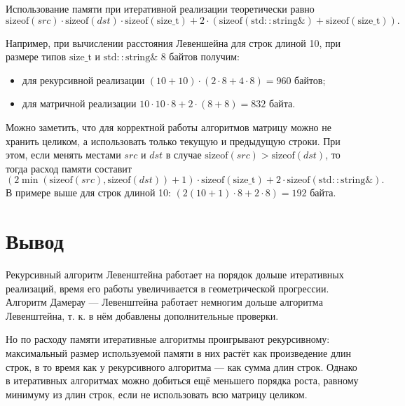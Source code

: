 Использование памяти при итеративной реализации теоретически равно
\[
\mathrm{sizeof}(src) \cdot \mathrm{sizeof}(dst) \cdot \mathrm{sizeof(size\_t)} + 2\cdot(\mathrm{sizeof (std\!::\!string\&)} + \mathrm{sizeof(size\_t)}).
\]

Например, при вычислении расстояния Левеншейна для строк длиной 10, при размере типов $\mathrm{size\_t}$ и $\mathrm{std\!::\!string\&}$ 8 байтов получим:
\begin{itemize}
	\item для рекурсивной реализации $(10 + 10) \cdot (2\cdot8 + 4\cdot8) = 960$ байтов;
	\item для матричной реализации $10 \cdot 10 \cdot 8 + 2\cdot(8 + 8) = 832$ байта.
\end{itemize}

Можно заметить, что для корректной работы алгоритмов матрицу можно не хранить целиком, а использовать только текущую и предыдущую строки. При этом, если менять местами $src$ и $dst$ в случае $\mathrm{sizeof}(src) > \mathrm{sizeof}(dst)$, то тогда расход памяти составит
\[
(2\min(\mathrm{sizeof}(src), \mathrm{sizeof}(dst)) + 1) \cdot \mathrm{sizeof(size\_t)} + 2\cdot\mathrm{sizeof (std\!::\!string\&)}.
\]
В примере выше для строк длиной 10: $(2(10 + 1)\cdot8 + 2\cdot8) = 192$ байта.

\section*{Вывод}

Рекурсивный алгоритм Левенштейна работает на порядок дольше итеративных реализаций, время его работы увеличивается в геометрической прогрессии. Алгоритм Дамерау — Левенштейна работает немногим дольше алгоритма Левенштейна, т. к. в нём добавлены дополнительные проверки.

Но по расходу памяти итеративные алгоритмы проигрывают рекурсивному: максимальный размер используемой памяти в них растёт как произведение длин строк, в то время как у рекурсивного алгоритма — как сумма длин строк. Однако в итеративных алгоритмах можно добиться ещё меньшего порядка роста, равному минимуму из длин строк, если не использовать всю матрицу целиком.
